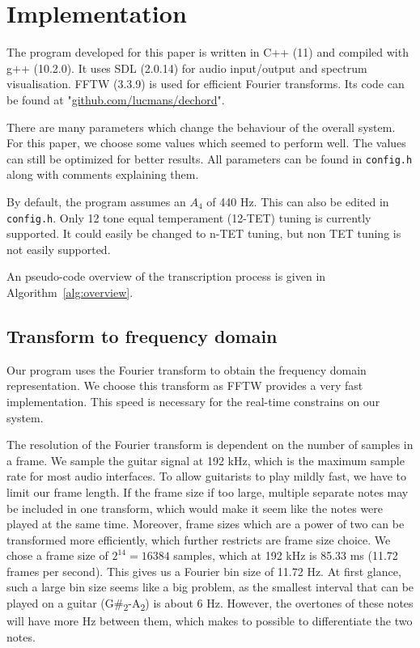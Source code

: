 \documentclass[10pt,twocolumn]{article}
\begin{document}
\section{Implementation}  \label{sec:impl}
The program developed for this paper is written in C++ (11) and compiled with g++ (10.2.0). It uses SDL (2.0.14) for audio input/output and spectrum visualisation. FFTW (3.3.9) is used for efficient Fourier transforms. Its code can be found at "\url{github.com/lucmans/dechord}".

There are many parameters which change the behaviour of the overall system. For this paper, we choose some values which seemed to perform well. The values can still be optimized for better results. All parameters can be found in \texttt{config.h} along with comments explaining them.

By default, the program assumes an $A_4$ of 440 Hz. This can also be edited in \texttt{config.h}. Only 12 tone equal temperament (12-TET) tuning is currently supported. It could easily be changed to n-TET tuning, but non TET tuning is not easily supported.

An pseudo-code overview of the transcription process is given in Algorithm~\ref{alg:overview}.


\subsection{Transform to frequency domain}  \label{sub:four}
Our program uses the Fourier transform to obtain the frequency domain representation. We choose this transform as FFTW provides a very fast implementation. This speed is necessary for the real-time constrains on our system.

The resolution of the Fourier transform is dependent on the number of samples in a frame. We sample the guitar signal at 192 kHz, which is the maximum sample rate for most audio interfaces. To allow guitarists to play mildly fast, we have to limit our frame length. If the frame size if too large, multiple separate notes may be included in one transform, which would make it seem like the notes were played at the same time. Moreover, frame sizes which are a power of two can be transformed more efficiently, which further restricts are frame size choice. We chose a frame size of $2^{14} = 16384$ samples, which at 192 kHz is 85.33 ms (11.72 frames per second). This gives us a Fourier bin size of 11.72 Hz. At first glance, such a large bin size seems like a big problem, as the smallest interval that can be played on a guitar (G\#\textsubscript{2}-A\textsubscript{2}) is about 6 Hz. However, the overtones of these notes will have more Hz between them, which makes to possible to differentiate the two notes.%
\end{document}
